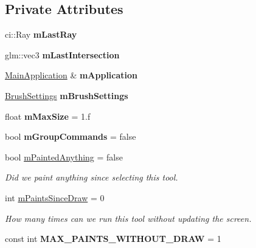\subsection*{Private Attributes}
\begin{DoxyCompactItemize}
\item 
\mbox{\label{classpepr3d_1_1_brush_a14e8b45a6cab895de81f98d316764fd8}} 
ci\+::\+Ray {\bfseries m\+Last\+Ray}
\item 
\mbox{\label{classpepr3d_1_1_brush_aa35b7375e5b51b71193f4ebb6a47e40a}} 
glm\+::vec3 {\bfseries m\+Last\+Intersection}
\item 
\mbox{\label{classpepr3d_1_1_brush_aa3ae79e358a25a2b2c0991bb279867fa}} 
\mbox{\hyperlink{classpepr3d_1_1_main_application}{Main\+Application}} \& {\bfseries m\+Application}
\item 
\mbox{\label{classpepr3d_1_1_brush_a3128cd83946b4f78252d85a782b9930c}} 
\mbox{\hyperlink{structpepr3d_1_1_brush_settings}{Brush\+Settings}} {\bfseries m\+Brush\+Settings}
\item 
\mbox{\label{classpepr3d_1_1_brush_ac4988a483a10b304b2334d40cf3c6439}} 
float {\bfseries m\+Max\+Size} = 1.f
\item 
\mbox{\label{classpepr3d_1_1_brush_a04835f1e155d63adc659650cf372a6aa}} 
bool {\bfseries m\+Group\+Commands} = false
\item 
\mbox{\label{classpepr3d_1_1_brush_a3b228cb4c9e5e7bf60904ab74e2fc6df}} 
bool \mbox{\hyperlink{classpepr3d_1_1_brush_a3b228cb4c9e5e7bf60904ab74e2fc6df}{m\+Painted\+Anything}} = false
\begin{DoxyCompactList}\small\item\em Did we paint anything since selecting this tool. \end{DoxyCompactList}\item 
\mbox{\label{classpepr3d_1_1_brush_a0d333fbd43343ebb6d2cafa60d7220f0}} 
int \mbox{\hyperlink{classpepr3d_1_1_brush_a0d333fbd43343ebb6d2cafa60d7220f0}{m\+Paints\+Since\+Draw}} = 0
\begin{DoxyCompactList}\small\item\em How many times can we run this tool without updating the screen. \end{DoxyCompactList}\item 
\mbox{\label{classpepr3d_1_1_brush_a5df405cb3c238fac2e0b036a52ca59e7}} 
const int {\bfseries M\+A\+X\+\_\+\+P\+A\+I\+N\+T\+S\+\_\+\+W\+I\+T\+H\+O\+U\+T\+\_\+\+D\+R\+AW} = 1
\end{DoxyCompactItemize}
